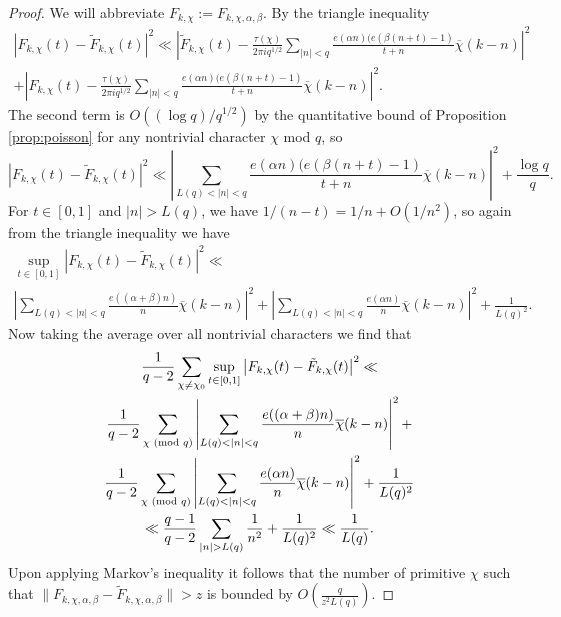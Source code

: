 \documentclass[10pt,a4paper]{amsart}
\newcommand{\abs}[1]{\left|#1\right|}
\newcommand{\chibar}{\overline \chi}
\renewcommand{\mod}[1]{{\ifmmode\text{\rm\ (mod~$#1$)}\else\discretionary{}{}{\hbox{ }}\rm(mod~$#1$)\fi}}
\begin{document}
\begin{proof}
    We will abbreviate $F_{k,\chi} := F_{k,\chi,\alpha,\beta}$.
    By the triangle inequality
    \begin{multline*}
        \abs{F_{k,\chi}(t) - \tilde F_{k,\chi}(t)}^2
        \ll \abs{\tilde F_{k,\chi}(t) -
            \frac{\tau(\chi)}{2 \pi i q^{1/2}} \sum_{\abs{n} < q}
    \frac{e(\alpha n)(e(\beta(n + t) - 1)}
        {t + n}\chibar(k - n)
            }^2 \\
            +
        \abs{F_{k,\chi}(t) -
            \frac{\tau(\chi)}{2 \pi i q^{1/2}} \sum_{\abs{n} < q}
    \frac{e(\alpha n)(e(\beta(n + t) - 1)}
        {t + n}\chibar(k - n)
            }^2.
    \end{multline*}
    The second term is $O((\log q)/q^{1/2})$ by the quantitative bound of
    Proposition \ref{prop:poisson} for any nontrivial character $\chi$ mod $q$,
    so
    \[
    \abs{F_{k,\chi}(t) - \tilde F_{k,\chi}(t)}^2
        \ll
            \abs{
            \sum_{L(q) < |n| < q}
            \frac{e(\alpha n)(e(\beta(n + t) - 1)}
            {t + n}
            \chibar(k - n)
        }^2 + \frac{\log q}{q}.
    \]
    For $t \in [0,1]$ and $|n| > L(q)$, we have $1/(n-t) = 1/n + O(1/n^2)$,
    so again from the triangle inequality we have
    \begin{multline}\label{eq:supbound}
        \sup_{t\in[0,1]} \abs{F_{k,\chi}(t) - \tilde F_{k,\chi}(t)}^2 \ll
        \\
            \abs{
            \sum_{L(q) < |n| < q}
            \frac{e((\alpha + \beta)n)}
            {n}
            \chibar(k - n)
        }^2 +
            \abs{
            \sum_{L(q) < |n| < q}
            \frac{e(\alpha n)}
            {n}
            \chibar(k - n)
        }^2
             + \frac{1}{L(q)^{2}}.
     \end{multline}
    Now taking the average over all nontrivial characters we find that
    \begin{multline*}
        \frac{1}{q-2}\sum_{\chi \ne \chi_0} \sup_{t\in[0,1]} \abs{F_{k,\chi}(t) - \tilde F_{k,\chi}(t)}^2 \ll \\
        \frac{1}{q-2}
        \sum_{\chi \mod q}
            \abs{
            \sum_{L(q) < |n| < q}
            \frac{e((\alpha + \beta)n)}
            {n}
            \chibar(k - n)
        }^2 + \\
        \frac{1}{q-2}
        \sum_{\chi \mod q}
            \abs{
            \sum_{L(q) < |n| < q}
            \frac{e(\alpha n)}
            {n}
            \chibar(k - n)
        }^2
        + \frac{1}{L(q)^{2}}
        \\
        \ll 
        \frac{q-1}{q-2}\sum_{|n| > L(q)} \frac{1}{n^2} + \frac{1}{L(q)^2}
        \ll
        \frac{1}{L(q)}.
    \end{multline*}
    Upon applying Markov's inequality it follows that the number of primitive $\chi$ such that
    $\|F_{k, \chi,\alpha,\beta} - \tilde F_{k, \chi,\alpha,\beta}\| > z$ is bounded by
    $O\left(\frac{q}{z^2 L(q)}\right)$.


\end{proof}
\end{document}

